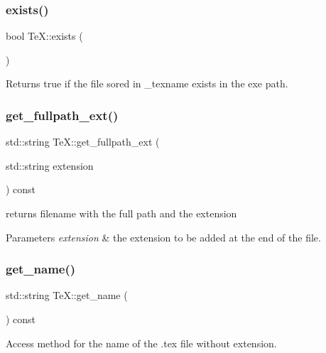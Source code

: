 \subsubsection{\texorpdfstring{exists()}{exists()}}
{\footnotesize\ttfamily bool Te\+X\+::exists (\begin{DoxyParamCaption}{ }\end{DoxyParamCaption})\hspace{0.3cm}{\ttfamily [inline]}}

Returns true if the file sored in \+\_\+texname exists in the exe path. \mbox{\label{class_te_x_a18399db9f0d97b7c06e7fa72d1a146c4}} 
\subsubsection{\texorpdfstring{get\+\_\+fullpath\+\_\+ext()}{get\_fullpath\_ext()}}
{\footnotesize\ttfamily std\+::string Te\+X\+::get\+\_\+fullpath\+\_\+ext (\begin{DoxyParamCaption}\item[{std\+::string}]{extension }\end{DoxyParamCaption}) const}

returns filename with the full path and the extension 
\begin{DoxyParams}{Parameters}
{\em extension} & the extension to be added at the end of the file. \\
\hline
\end{DoxyParams}
\mbox{\label{class_te_x_aacfd237cb2f7ea19afe01895fc1987dc}} 
\subsubsection{\texorpdfstring{get\+\_\+name()}{get\_name()}}
{\footnotesize\ttfamily std\+::string Te\+X\+::get\+\_\+name (\begin{DoxyParamCaption}{ }\end{DoxyParamCaption}) const}

Access method for the name of the .tex file without extension. \mbox{\label{class_te_x_a8252aa7134ebc330a8b3da6462f13aeb}} 
